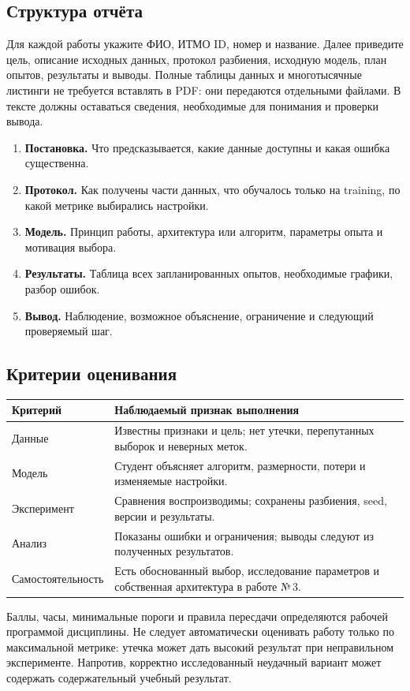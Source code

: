 \subsection*{Структура отчёта}
Для каждой работы укажите ФИО, ИТМО ID, номер и название. Далее приведите цель, описание исходных данных, протокол разбиения, исходную модель, план опытов, результаты и выводы. Полные таблицы данных и многотысячные листинги не требуется вставлять в PDF: они передаются отдельными файлами. В тексте должны оставаться сведения, необходимые для понимания и проверки вывода.

\begin{enumerate}
\item \textbf{Постановка.} Что предсказывается, какие данные доступны и какая ошибка существенна.
\item \textbf{Протокол.} Как получены части данных, что обучалось только на training, по какой метрике выбирались настройки.
\item \textbf{Модель.} Принцип работы, архитектура или алгоритм, параметры опыта и мотивация выбора.
\item \textbf{Результаты.} Таблица всех запланированных опытов, необходимые графики, разбор ошибок.
\item \textbf{Вывод.} Наблюдение, возможное объяснение, ограничение и следующий проверяемый шаг.
\end{enumerate}

\subsection*{Критерии оценивания}
\begin{table}[H]\centering\small
\begin{tabularx}{\textwidth}{@{}p{}Y@{}}
\toprule
Критерий & Наблюдаемый признак выполнения \\
\midrule
Данные & Известны признаки и цель; нет утечки, перепутанных выборок и неверных меток. \\
Модель & Студент объясняет алгоритм, размерности, потери и изменяемые настройки. \\
Эксперимент & Сравнения воспроизводимы; сохранены разбиения, seed, версии и результаты. \\
Анализ & Показаны ошибки и ограничения; выводы следуют из полученных результатов. \\
Самостоятельность & Есть обоснованный выбор, исследование параметров и собственная архитектура в работе №\,3. \\
\bottomrule
\end{tabularx}\end{table}
Баллы, часы, минимальные пороги и правила пересдачи определяются рабочей программой дисциплины. Не следует автоматически оценивать работу только по максимальной метрике: утечка может дать высокий результат при неправильном эксперименте. Напротив, корректно исследованный неудачный вариант может содержать содержательный учебный результат.

